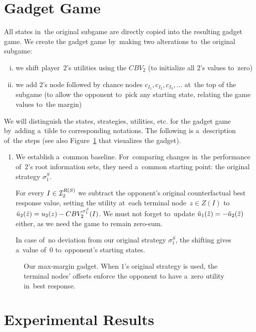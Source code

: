 \section{Gadget Game}
All states in~the original subgame are directly copied into the resulting gadget game.
We create the gadget game by~making two alterations to~the original subgame:
\begin{enumerate}[(i)]
  \item we shift player~$2$'s utilities using the $CBV_2$ (to initialize all $2$'s values to~zero)
  \item we add $2$'s node followed by chance nodes $c_{I_1}, c_{I_2}, c_{I_3}, \dots$ at~the top of the subgame (to allow the opponent to~pick any starting state, relating the game values to~the margin)
\end{enumerate}
We will distinguish the states, strategies, utilities, etc. for the gadget game by~adding a~tilde to corresponding notations.
The following is a~description of~the steps (see also Figure~\ref{fig:max-margin-gadget} that visualizes the gadget).
\begin{enumerate}
  \item We establish a~common baseline.
    For~comparing changes in~the performance of~$2$'s root information sets, they need a~common starting point:
    the original strategy $\sigma_1^S$.

    For every $I \in \mathcal{I}_2^{R(S)}$ we subtract the opponent's original counterfactual best response value, setting the utility at~each terminal node~$z \in Z(I)$ to $\tilde{u}_2(\tilde{z}) = u_2(z) - CBV_2^{\sigma^S_1}(I)$.
    We must not forget to~update $\tilde{u}_1(\tilde{z}) = -\tilde{u}_2(\tilde{z})$ either, as we need the game to remain zero-sum.

    In case of~no deviation from our original strategy $\sigma_1^S$, the shifting gives a~value of~$0$ to~opponent's starting states.
\end{enumerate}
\todo

\begin{figure}[H]
  \centering
  \def\svgwidth{.4\textwidth}
  
  \def\captionTitle{Our max-margin gadget}
  \caption[\captionTitle]{\captionTitle. When $1$'s original strategy is used, the terminal nodes' offsets enforce the opponent to have a~zero utility in~best response.}
  \label{fig:max-margin-gadget}
\end{figure}

\section{Experimental Results}
